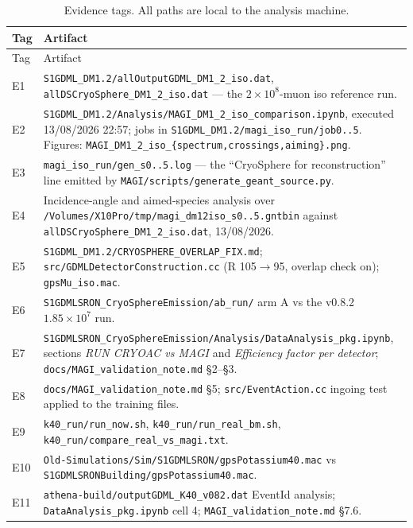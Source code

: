 \documentclass[11pt,a4paper]{article}
\begin{document}
\begin{longtable}{p{1.1cm}>{\raggedright\arraybackslash}p{14.5cm}}
\caption{Evidence tags. All paths are local to the analysis machine.}
\label{tab:prov}\\
\toprule
Tag & Artifact \\
\midrule
\endfirsthead
\toprule
Tag & Artifact \\
\midrule
\endhead
\bottomrule
\endfoot
E1 & \texttt{S1GDML\_DM1.2/allOutputGDML\_DM1\_2\_iso.dat},
     \texttt{allDSCryoSphere\_DM1\_2\_iso.dat} --- the $2\times10^{8}$-muon iso
     reference run. \\
E2 & \texttt{S1GDML\_DM1.2/Analysis/MAGI\_DM1\_2\_iso\_comparison.ipynb},
     executed 13/08/2026 22:57; jobs in
     \texttt{S1GDML\_DM1.2/magi\_iso\_run/job0..5}. Figures:
     \texttt{MAGI\_DM1\_2\_iso\_\{spectrum,crossings,aiming\}.png}. \\
E3 & \texttt{magi\_iso\_run/gen\_s0..5.log} --- the
     ``CryoSphere for reconstruction'' line emitted by
     \texttt{MAGI/scripts/generate\_geant\_source.py}. \\
E4 & Incidence-angle and aimed-species analysis over
     \texttt{/Volumes/X10Pro/tmp/magi\_dm12iso\_s0..5.gntbin} against
     \texttt{allDSCryoSphere\_DM1\_2\_iso.dat}, 13/08/2026. \\
E5 & \texttt{S1GDML\_DM1.2/CRYOSPHERE\_OVERLAP\_FIX.md};
     \texttt{src/GDMLDetectorConstruction.cc} (R 105$\to$95, overlap check on);
     \texttt{gpsMu\_iso.mac}. \\
E6 & \texttt{S1GDMLSRON\_CryoSphereEmission/ab\_run/} arm A vs the v0.8.2
     $1.85\times10^{7}$ run. \\
E7 & \texttt{S1GDMLSRON\_CryoSphereEmission/Analysis/DataAnalysis\_pkg.ipynb},
     sections \emph{RUN CRYOAC vs MAGI} and \emph{Efficiency factor per
     detector}; \texttt{docs/MAGI\_validation\_note.md} \S2--\S3. \\
E8 & \texttt{docs/MAGI\_validation\_note.md} \S5;
     \texttt{src/EventAction.cc} ingoing test applied to the training files. \\
E9 & \texttt{k40\_run/run\_now.sh}, \texttt{k40\_run/run\_real\_bm.sh},
     \texttt{k40\_run/compare\_real\_vs\_magi.txt}. \\
E10& \texttt{Old-Simulations/Sim/S1GDMLSRON/gpsPotassium40.mac} vs
     \texttt{S1GDMLSRONBuilding/gpsPotassium40.mac}. \\
E11& \texttt{athena-build/outputGDML\_K40\_v082.dat} EventId analysis;
     \texttt{DataAnalysis\_pkg.ipynb} cell 4;
     \texttt{MAGI\_validation\_note.md} \S7.6. \\

\end{longtable}
\end{document}
